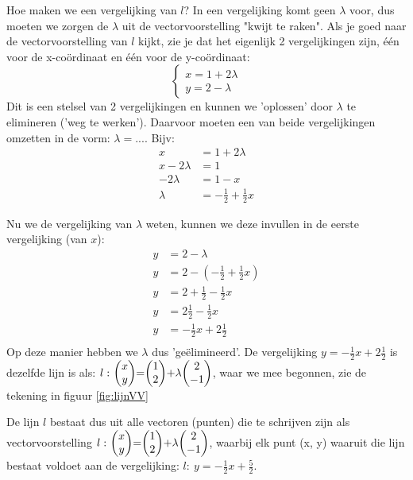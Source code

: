 Hoe maken we een vergelijking van  $ l $? In een vergelijking komt geen $ \lambda $ voor, dus moeten we zorgen de $ \lambda $ uit de vectorvoorstelling "kwijt te raken". Als je goed naar de vectorvoorstelling van $ l $ kijkt, zie je dat het eigenlijk 2 vergelijkingen zijn, één voor de x-coördinaat en één voor de y-coördinaat:
\[\begin{cases}
x = 1 + 2\lambda\\
y = 2 - \lambda 
\end{cases}
\] 
Dit is een stelsel van 2 vergelijkingen  en kunnen we 'oplossen' door $ \lambda $ te elimineren ('weg te werken'). Daarvoor moeten een van beide vergelijkingen omzetten in de vorm: $\lambda = ...$. Bijv:
\begin{align*}
  x & = 1 + 2\lambda \\
  x - 2\lambda &= 1 \\
  -2\lambda &= 1 - x \\
  \lambda &= -\frac{1}{2} + \frac{1}{2}x
\end{align*}

\newpage
Nu we de vergelijking van $\lambda$ weten, kunnen we deze invullen in de eerste vergelijking (van $x$):
\begin{align*}
  y &= 2 - \lambda \\
  y &= 2 - (-\frac{1}{2} + \frac{1}{2}x) \\
  y &= 2 + \frac{1}{2} - \frac{1}{2}x \\
  y &= 2\frac{1}{2} - \frac{1}{2}x \\
  y &= -\frac{1}{2}x + 2\frac{1}{2} \\
\end{align*}
Op deze manier hebben we $\lambda$ dus 'geëlimineerd'. De vergelijking  $ y = -\frac{1}{2}x + 2\frac{1}{2} $  is dezelfde lijn is als: $ l: \ \vectwee {x}{y} = \vectwee {1}{2} + \lambda  \vectwee {2}{-1}  $, waar we mee begonnen, zie de tekening in  figuur  \ref{fig:lijnVV}


De lijn $l$ bestaat dus uit alle vectoren (punten) die te schrijven zijn als vectorvoorstelling $ l: \ \vectwee {x}{y} = \vectwee {1}{2} + \lambda  \vectwee {2}{-1}  $, waarbij elk punt (x, y) waaruit die lijn bestaat voldoet aan de vergelijking: $ l:  \ y = - \frac{1}{2}x + \frac{5}{2} $.

